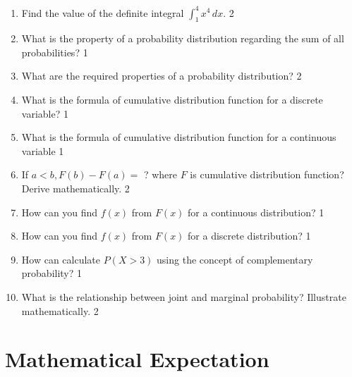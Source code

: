 \documentclass[a4paper,oneside, margin=1.4in]{book}
\begin{document}
\begin{enumerate}
\item Find the value of the definite integral \( \int_1^4 x^4 \, dx \). \hfill 2

\item What is the property of a probability distribution regarding the sum of all probabilities? \hfill 1

\item What are the required properties of a probability distribution? \hfill 2

\item What is the formula of cumulative distribution function for a discrete variable? \hfill 1

\item What is the formula of cumulative distribution function for a continuous variable \hfill 1

\item If $a<b, F(b) - F(a) =$ ? where $F$ is cumulative distribution function? Derive mathematically. \hfill 2

\item How can you find $f(x)$ from $F(x)$ for a continuous distribution? \hfill 1

\item How can you find $f(x)$ from $F(x)$ for a discrete distribution? \hfill 1

  \item How can calculate $P(X>3)$ using the concept of complementary probability?  \hfill 1

\item What is the relationship between joint and marginal probability? Illustrate mathematically. \hfill 2


  \end{enumerate}

\chapter{Mathematical Expectation} 
\end{document}
